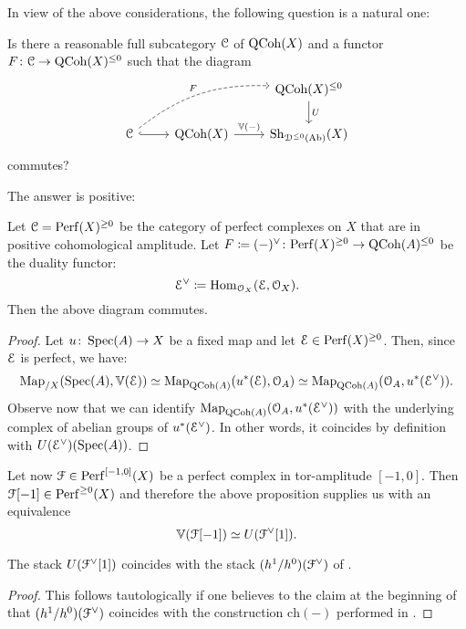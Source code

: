 In view of the above considerations, the following question is a natural one:

\begin{question}
	Is there a reasonable full subcategory $\mathcal C$ of $\mathrm{QCoh}(X)$ and a functor $F \colon \mathcal C \to \mathrm{QCoh}(X)^{\le 0}$ such that the diagram
	\[ \begin{tikzcd}
		{} & & \QCoh(X)^{\le 0} \arrow{d}{U} \\
		\cC \arrow[dashed, bend left = 20]{urr}{F} \arrow[hook]{r} & \QCoh(X) \arrow{r}{\mathbb V(-)} & \Sh_{\cD^{\le 0}(\Ab)}(X)
	\end{tikzcd} \]
	commutes?
\end{question}

The answer is positive:

\begin{prop}
	Let $\mathcal C = \mathrm{Perf}(X)^{\ge 0}$ be the category of perfect complexes on $X$ that are in positive cohomological amplitude.
	Let $F \coloneqq (-)^\vee \colon \mathrm{Perf}(X)^{\ge 0} \to \mathrm{QCoh}(A)^{\le 0}$ be the duality functor:
	\[ \mathcal E^\vee \coloneqq \operatorname{Hom}_{\mathcal O_X}(\mathcal E, \mathcal O_X) . \]
	Then the above diagram commutes.
\end{prop}

\begin{proof}
	Let $u \colon \operatorname{Spec}(A) \to X$ be a fixed map and let $\mathcal E \in \mathrm{Perf}(X)^{\ge 0}$.
	Then, since $\mathcal E$ is perfect, we have:
	\[ \operatorname{Map}_{/X}(\operatorname{Spec}(A), \mathbb V(\mathcal E)) \simeq \operatorname{Map}_{\mathrm{QCoh}(A)}(u^*(\mathcal E), \mathcal O_A) \simeq \operatorname{Map}_{\mathrm{QCoh}(A)}(\mathcal O_A, u^*(\mathcal E^\vee)) . \]
	Observe now that we can identify $\operatorname{Map}_{\mathrm{QCoh}(A)}(\mathcal O_A, u^*(\mathcal E^\vee))$ with the underlying complex of abelian groups of $u^*(\mathcal E^\vee)$.
	In other words, it coincides by definition with $U(\mathcal E^\vee)(\operatorname{Spec}(A))$.
\end{proof}

Let now $\mathcal F \in \mathrm{Perf}^{[-1,0]}(X)$ be a perfect complex in tor-amplitude $[-1,0]$.
Then $\mathcal F[-1] \in \mathrm{Perf}^{\ge 0}(X)$ and therefore the above proposition supplies us with an equivalence
\[ \mathbb V(\mathcal F[-1]) \simeq U(\mathcal F^\vee[1]) . \]

\begin{prop}
	The stack $U(\mathcal F^\vee [1])$ coincides with the stack $(h^1 / h^0)(\mathcal F^\vee)$ of \cite{Behrend_Intrinsic_normal_cone_1997}.
\end{prop}

\begin{proof}
	This follows tautologically if one believes to the claim at the beginning of \cite[\S 2]{Behrend_Intrinsic_normal_cone_1997} that $(h^1 / h^0)(\mathcal F^\vee)$ coincides with the construction $\mathrm{ch}(-)$ performed in \cite[Expos\'e XVIII, \S 1.4]{SGA4}.
\end{proof}


